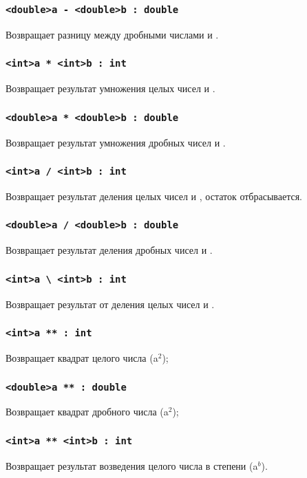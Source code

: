 \documentclass[a4paper, 14pt]{extarticle}
\begin{document}
\subsubsection{\lstinline`<double>a - <double>b : double`}
	Возвращает разницу между дробными числами  и .

\subsubsection{\lstinline`<int>a * <int>b : int`}
	Возвращает результат умножения целых чисел  и .

\subsubsection{\lstinline`<double>a * <double>b : double`}
	Возвращает результат умножения дробных чисел  и .

\subsubsection{\lstinline`<int>a / <int>b : int`}
	Возвращает результат деления целых чисел  и , остаток отбрасывается.

\subsubsection{\lstinline`<double>a / <double>b : double`}
	Возвращает результат деления дробных чисел  и .

\subsubsection{\lstinline`<int>a \ <int>b : int`}
	Возвращает результат от деления целых чисел  и .


\subsubsection{\lstinline`<int>a ** : int`}
	Возвращает квадрат целого числа  (a$^2$);

\subsubsection{\lstinline`<double>a ** : double`}
	Возвращает квадрат дробного числа  (a$^2$);

\subsubsection{\lstinline`<int>a ** <int>b : int`}
	Возвращает результат возведения целого числа  в степени  (a$^b$).
\end{document}
